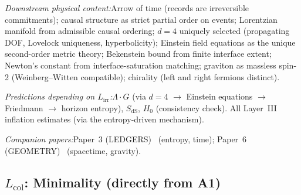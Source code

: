 \documentclass[11pt]{article}
\newcommand{\LG}{\Lambda \cdot G}
\newcommand{\Lirr}{L_{\mathrm{irr}}}
\begin{document}
\begin{tcolorbox}[apfbox, title={$\Lirr$ $\longrightarrow$ Spacetime and Thermodynamics}]
\smallskip\noindent\textit{Downstream physical content:}\quad Arrow of time (records are irreversible commitments); causal structure as strict partial order on events; Lorentzian manifold from admissible causal ordering; $d = 4$ uniquely selected (propagating DOF, Lovelock uniqueness, hyperbolicity); Einstein field equations as the unique second-order metric theory; Bekenstein bound from finite interface extent; Newton's constant from interface-saturation matching; graviton as massless spin-2 (Weinberg--Witten compatible); chirality (left and right fermions distinct).

\smallskip\noindent\textit{Predictions depending on $\Lirr$:}\quad $\LG$ (via $d = 4$ $\to$ Einstein equations $\to$ Friedmann $\to$ horizon entropy), $S_{\mathrm{dS}}$, $H_0$ (consistency check).  All Layer~III inflation estimates (via the entropy-driven mechanism).

\smallskip\noindent\textit{Companion papers:}\quad Paper~3 (LEDGERS)~\cite{P3} (entropy, time); Paper~6 (GEOMETRY)~\cite{P6} (spacetime, gravity).
\end{tcolorbox}

\subsection{\texorpdfstring{$L_{\mathrm{col}}$}{Lcol}: Minimality (directly from A1)}
\end{document}
